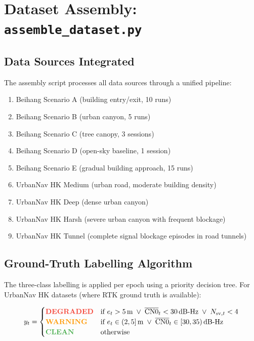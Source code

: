 \documentclass[12pt,a4paper]{article}
\newcommand{\clean}[1]{\textcolor{cleanGreen}{\textbf{#1}}}
\newcommand{\warn}[1]{\textcolor{warnOrange}{\textbf{#1}}}
\newcommand{\degrad}[1]{\textcolor{degradRed}{\textbf{#1}}}
\begin{document}
\section{Dataset Assembly: \texttt{assemble\_dataset.py}}

\subsection{Data Sources Integrated}

The assembly script processes all data sources through a unified pipeline:

\begin{enumerate}
  \item Beihang Scenario A (building entry/exit, 10 runs)
  \item Beihang Scenario B (urban canyon, 5 runs)
  \item Beihang Scenario C (tree canopy, 3 sessions)
  \item Beihang Scenario D (open-sky baseline, 1 session)
  \item Beihang Scenario E (gradual building approach, 15 runs)
  \item UrbanNav HK Medium (urban road, moderate building density)
  \item UrbanNav HK Deep (dense urban canyon)
  \item UrbanNav HK Harsh (severe urban canyon with frequent blockage)
  \item UrbanNav HK Tunnel (complete signal blockage episodes in road tunnels)
\end{enumerate}

\subsection{Ground-Truth Labelling Algorithm}

The three-class labelling is applied per epoch using a priority decision tree.
For UrbanNav HK datasets (where RTK ground truth is available):

\begin{equation}
  y_t = \begin{cases}
    \degrad{\text{DEGRADED}} &
    \text{if } e_t > 5\,\text{m} \;\lor\;
    \overline{\text{CN0}}_t < 30\,\text{dB-Hz} \;\lor\;
    N_{\mathrm{sv},t} < 4 \\
    \warn{\text{WARNING}} &
    \text{if } e_t \in (2, 5]\,\text{m} \;\lor\;
    \overline{\text{CN0}}_t \in [30, 35)\,\text{dB-Hz} \\
    \clean{\text{CLEAN}} & \text{otherwise}
  \end{cases}
\end{equation}
\end{document}
